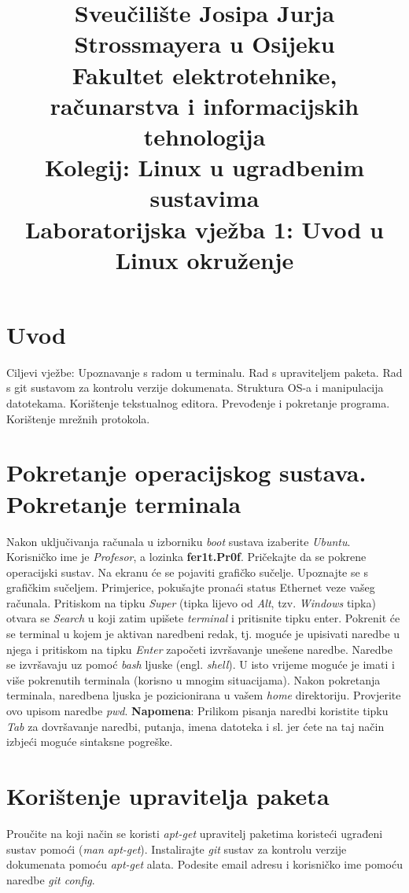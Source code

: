 \documentclass[11pt]{article}
\title{
	\Large Sveučilište Josipa Jurja Strossmayera u Osijeku \\
	Fakultet elektrotehnike, računarstva i informacijskih tehnologija \\
	\vspace{4cm}
	\Large Kolegij: Linux u ugradbenim sustavima \\
	\vspace{4cm}
	\Large \textbf{Laboratorijska vježba 1: Uvod u Linux okruženje}
	}
\date{}
\begin{document}
\maketitle
\thispagestyle{empty}
\newpage

\section{Uvod}
Ciljevi vježbe: Upoznavanje s radom u terminalu. Rad s upraviteljem paketa.
Rad s git sustavom za kontrolu verzije dokumenata. Struktura OS-a i manipulacija datotekama. Korištenje tekstualnog
editora. Prevođenje i pokretanje programa. Korištenje mrežnih protokola.

\section{Pokretanje operacijskog sustava. Pokretanje terminala}
Nakon uključivanja računala u izborniku \textit{boot} sustava izaberite
\textit{Ubuntu}. Korisničko ime je \textit{Profesor}, a lozinka \textbf{fer1t.Pr0f}.
Pričekajte da se pokrene operacijski sustav. Na ekranu će se pojaviti
grafičko sučelje. Upoznajte se s grafičkim sučeljem. Primjerice, pokušajte
pronaći status Ethernet veze vašeg računala.
\newline
\newline
Pritiskom na tipku \textit{Super} (tipka lijevo od \textit{Alt}, tzv.
\textit{Windows} tipka) otvara se \textit{Search} u koji zatim upišete
 \textit{terminal} i pritisnite tipku enter. Pokrenit će se terminal u kojem je
 aktivan naredbeni redak, tj. moguće je upisivati naredbe u njega i pritiskom
 na tipku \textit{Enter} započeti izvršavanje unešene naredbe. Naredbe se
 izvršavaju uz pomoć \textit{bash} ljuske (engl. \textit{shell}). U isto
 vrijeme moguće je imati i više pokrenutih terminala (korisno u mnogim
 situacijama). Nakon pokretanja terminala, naredbena ljuska je pozicionirana
 u vašem \textit{home} direktoriju. Provjerite ovo upisom naredbe \textit{pwd}.
\newline
\newline
\textbf{Napomena}: Prilikom pisanja naredbi koristite tipku \textit{Tab} za
 dovršavanje naredbi, putanja, imena datoteka i sl. jer ćete na taj način
 izbjeći moguće sintaksne pogreške.

\section{Korištenje upravitelja paketa}
Proučite na koji način se koristi \textit{apt-get} upravitelj paketima
 koristeći ugrađeni sustav pomoći (\textit{man apt-get}). Instalirajte
 \textit{git} sustav za kontrolu verzije dokumenata pomoću \textit{apt-get}
 alata. Podesite email adresu i korisničko ime pomoću naredbe
 \textit{git config}.
\end{document}
